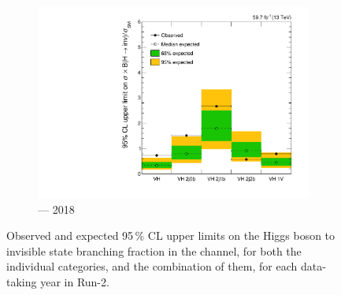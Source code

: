 \begin{figure}[htbp]
    \begin{subfigure}[b]{0.49\textwidth}
        \includegraphics[width=\textwidth]{chapters/higgstoinv/figures/limits/VH/limit_2018_VH.pdf}
        \caption{\VH --- 2018}
    \end{subfigure}
    \caption[Observed and expected 95\,\% CL upper limits on the Higgs boson to invisible state branching fraction in the \VH channel, for both the individual categories, and the combination of them, for each data-taking year in Run-2]{Observed and expected 95\,\% CL upper limits on the Higgs boson to invisible state branching fraction in the \VH channel, for both the individual categories, and the combination of them, for each data-taking year in Run-2.}
    \label{fig:htoinv_limit_VH_per_year}
\end{figure}

